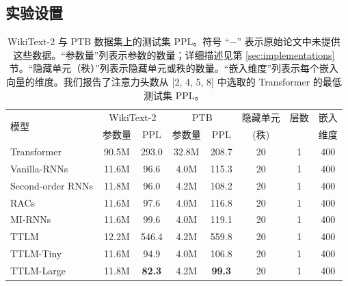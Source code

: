 \documentclass{article}
\theoremstyle{plain}
\theoremstyle{definition}
\theoremstyle{remark}
\begin{document}
\subsection{实验设置}
\label{sec:setting}
\begin{table}[t]
\small
\centering
  \begin{tabular}{l|cc|cc|ccc}
    \toprule
      \multirow{2}{*}{模型} & \multicolumn{2}{c|}{
      WikiText-2} &
    \multicolumn{2}{c|}{PTB} & 隐藏单元 & 层数 & 嵌入 \\

    &参数量 & PPL  & 参数量  & PPL & (秩) & & 维度\\

    \midrule
    Transformer \citep{vaswani2017attention} & 90.5M & 293.0 & 32.8M & 208.7 &20 & 1 & 400 \\
    Vanilla-RNNs \citep{mikolov2012context} & 11.6M & 96.6 & 4.0M & 115.3 & 20 & 1 & 400\\
    Second-order RNNs \citep{hochreiter1997long} & 11.8M & 96.0 & 4.2M& 108.2 & 20 & 1 & 400\\
    RACs  \citep{levine2018benefits} &11.6M& 97.6 & 4.0M  & 116.8 &20 & 1 & 400 \\
    MI-RNNs \citep{wu_multiplicative_2016} &  11.6M & 99.6 &4.0M & 119.1 & 20 & 1 & 400 \\
    \hline
    TTLM & 12.2M & 546.4 & 4.2M & 559.8 & 20& 1 & 400\\
    TTLM-Tiny & 11.6M &94.9 & 4.0M &106.8 & 20 & 1 & 400\\
    TTLM-Large &11.8M &\textbf{82.3} & 4.2M & \textbf{99.3} & 20 & 1 & 400 \\
  \bottomrule
\end{tabular}
\caption{WikiText-2 与 PTB 数据集上的测试集 PPL。符号 “$-$” 表示原始论文中未提供这些数据。“参数量”列表示参数的数量；详细描述见第 \ref{sec:implementations} 节。“隐藏单元（秩）”列表示隐藏单元或秩的数量。“嵌入维度”列表示每个嵌入向量的维度。我们报告了注意力头数从 [2, 4, 5, 8] 中选取的 Transformer 的最低测试集 PPL。\label{tab:evaluation}}
\end{table}
%
\end{document}
